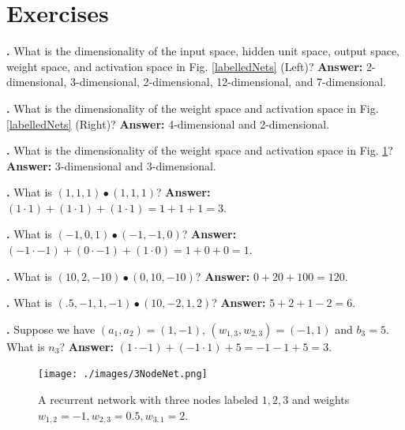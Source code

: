 \section{Exercises}\label{linear_algebra_exercises}


\noindent
{}
{\bf \theLinearAlgebraCounter.}  What is the dimensionality of the input space, hidden unit space, output space, weight space, and activation space in Fig. \ref{labelledNets} (Left)? 
{\bf Answer:} 2-dimensional, 3-dimensional, 2-dimensional, 12-dimensional, and 7-dimensional.
\bigskip

\noindent
{}
{\bf \theLinearAlgebraCounter.}  What is the dimensionality of the weight space and activation space in Fig. \ref{labelledNets} (Right)? 
{\bf Answer:} 4-dimensional and 2-dimensional.
\bigskip

\noindent
{}
{\bf \theLinearAlgebraCounter.}  What is the dimensionality of the weight space and activation space in Fig. \ref{sampleNetRecurrent}? 
{\bf Answer:} 3-dimensional and 3-dimensional.
\bigskip

\noindent
{}
{\bf \theLinearAlgebraCounter.}  What is $(1,1,1) \bullet  (1,1,1)$? 
{\bf Answer:}  $(1 \cdot 1) + (1 \cdot 1) + (1 \cdot 1) = 1 + 1 + 1 = 3$. 
\bigskip

\noindent
{}
{\bf \theLinearAlgebraCounter.}  What is $(-1,0,1) \bullet (-1,-1,0)$? 
{\bf Answer:} $(-1 \cdot -1) + (0 \cdot -1) + (1 \cdot 0) = 1 + 0 + 0 = 1$. 
\bigskip

\noindent
{}
{\bf \theLinearAlgebraCounter.}  What is $(10,2,-10) \bullet  (0,10,-10)$? 
{\bf Answer:}  $0 + 20 + 100 = 120$. 
\bigskip

\noindent
{}
{\bf \theLinearAlgebraCounter.}  What is $(.5,-1,1,-1) \bullet  (10,-2,1,2)$? 
{\bf Answer:}  $5 + 2 + 1 -2 = 6$. 
\bigskip

\noindent
{}
{\bf \theLinearAlgebraCounter.}  Suppose we have $(a_1,a_2) = (1,-1)$, $(w_{1,3}, w_{2,3})=(-1,1)$ and $b_3=5$. What is $n_3$? 
{\bf Answer:} $(1 \cdot -1) + (-1 \cdot 1) + 5 = -1 - 1 + 5 = 3$. 
\bigskip

\begin{figure}[h]
\centering
\texttt{[image: ./images/3NodeNet.png]}
\caption[Jeff Yoshimi.]{A recurrent network with three nodes labeled $1,2,3$ and weights $w_{1,2} = -1, w_{2,3}=0.5, w_{3,1}=2$.}
\label{sampleNetRecurrent}
\end{figure}

